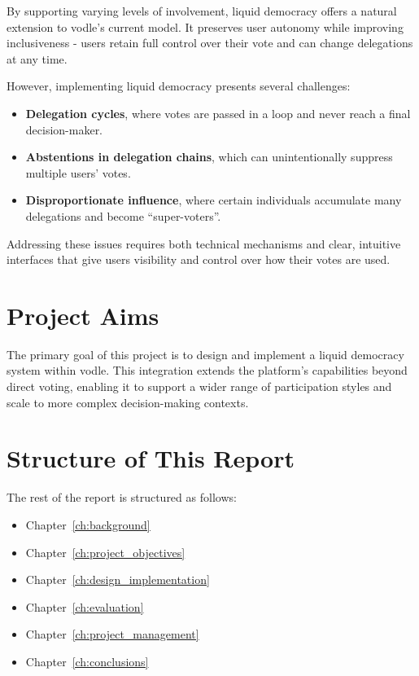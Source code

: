 By supporting varying levels of involvement, liquid democracy offers a natural extension to vodle's current model. It preserves user autonomy while improving inclusiveness - users retain full control over their vote and can change delegations at any time.

However, implementing liquid democracy presents several challenges:
\begin{itemize}
  \item \textbf{Delegation cycles}, where votes are passed in a loop and never reach a final decision-maker.
  \item \textbf{Abstentions in delegation chains}, which can unintentionally suppress multiple users' votes.
  \item \textbf{Disproportionate influence}, where certain individuals accumulate many delegations and become ``super-voters''.
\end{itemize}

Addressing these issues requires both technical mechanisms and clear, intuitive interfaces that give users visibility and control over how their votes are used.

\section{Project Aims}

The primary goal of this project is to design and implement a liquid democracy system within vodle. This integration extends the platform's capabilities beyond direct voting, enabling it to support a wider range of participation styles and scale to more complex decision-making contexts.


\section{Structure of This Report}

The rest of the report is structured as follows:

\begin{itemize}
  \item Chapter~\ref{ch:background}
  \item Chapter~\ref{ch:project_objectives}
  \item Chapter~\ref{ch:design_implementation}
  \item Chapter~\ref{ch:evaluation}
  \item Chapter~\ref{ch:project_management}
  \item Chapter~\ref{ch:conclusions}
\end{itemize}